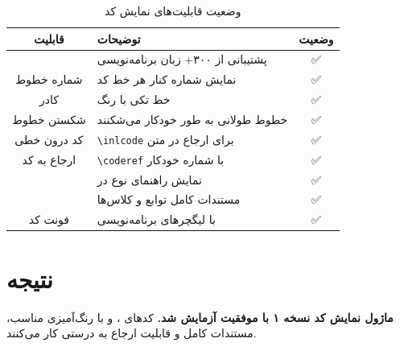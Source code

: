 \documentclass{matinbook}
\begin{document}
    \begin{table}[h]
        \centering
        \caption{وضعیت قابلیت‌های نمایش کد}
        \label{tab:code-status}
        \begin{tabular}{|c|C{6cm}|c|}
            \hline
            \textbf{قابلیت} & \textbf{توضیحات} & \textbf{وضعیت} \\
            \hline
             & پشتیبانی از ۳۰۰+ زبان برنامه‌نویسی & \textcolor{matingreen}{✅} \\
            شماره خطوط & نمایش شماره کنار هر خط کد & \textcolor{matingreen}{✅} \\
            کادر & خط تکی با رنگ  & \textcolor{matingreen}{✅} \\
            شکستن خطوط & خطوط طولانی به طور خودکار می‌شکنند & \textcolor{matingreen}{✅} \\
            کد درون خطی & \texttt{\textbackslash inlcode} برای ارجاع در متن & \textcolor{matingreen}{✅} \\
            ارجاع به کد & \texttt{\textbackslash coderef} با شماره خودکار & \textcolor{matingreen}{✅} \\
             & نمایش راهنمای نوع در  & \textcolor{matingreen}{✅} \\
             & مستندات کامل توابع و کلاس‌ها & \textcolor{matingreen}{✅} \\
            فونت کد &  با لیگچرهای برنامه‌نویسی & \textcolor{matingreen}{✅} \\
            \hline
        \end{tabular}
    \end{table}
    
    \section{نتیجه}
    
    \textbf{ماژول نمایش کد  نسخه ۱ با موفقیت آزمایش شد.}
    کدهای ،  و  با رنگ‌آمیزی مناسب،
    مستندات کامل و قابلیت ارجاع به درستی کار می‌کنند. 🎉
    
\end{document}
